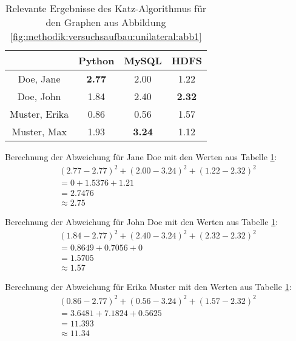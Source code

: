 \begin{table}[h]
	\centering
	\begin{tabular}{c|c|c|c}
		& Python & MySQL & HDFS\\ 
		\hline
		Doe, Jane     & \cellcolor{usercolor}\textbf{2.77} & \cellcolor{itemcolor}2.00 & \cellcolor{exxetagray}1.22\\
		Doe, John     & \cellcolor{exxetagray}1.84 & \cellcolor{itemcolor}2.40 & \cellcolor{itemcolor}\textbf{2.32}\\
		Muster, Erika & \cellcolor{exxetagray}0.86 & \cellcolor{exxetagray}0.56 & \cellcolor{usercolor}1.57\\
		Muster, Max   & \cellcolor{itemcolor}1.93 & \cellcolor{itemcolor}\textbf{3.24} & \cellcolor{exxetagray}1.12
	\end{tabular}
	\caption{Relevante Ergebnisse des Katz-Algorithmus für den Graphen aus Abbildung \ref{fig:methodik:versuchsaufbau:unilateral:abb1}}
	\label{tbl:nebenrechnungen:bilateral:tbl2}
\end{table}

Berechnung der Abweichung für Jane Doe mit den Werten aus Tabelle \ref{tbl:nebenrechnungen:bilateral:tbl2}:
\begin{gather}
	\nonumber (2.77-2.77)^2 + (2.00-3.24)^2 + (1.22-2.32)^2\\
	\nonumber = 0 + 1.5376 + 1.21\\
	\nonumber = 2.7476\\
	\approx 2.75
	\label{frml:nebenrechnungen:bilateral:jane}
\end{gather}

Berechnung der Abweichung für John Doe mit den Werten aus Tabelle \ref{tbl:nebenrechnungen:bilateral:tbl2}:
\begin{gather}
	\nonumber (1.84-2.77)^2 + (2.40-3.24)^2 + (2.32-2.32)^2\\
	\nonumber = 0.8649 + 0.7056 + 0\\
	\nonumber = 1.5705\\
	\approx 1.57
	\label{frml:nebenrechnungen:bilateral:john}
\end{gather}

Berechnung der Abweichung für Erika Muster mit den Werten aus Tabelle \ref{tbl:nebenrechnungen:bilateral:tbl2}:
\begin{gather}
	\nonumber (0.86-2.77)^2 + (0.56-3.24)^2 + (1.57-2.32)^2\\
	\nonumber = 3.6481 + 7.1824 + 0.5625\\
	\nonumber = 11.393\\
	\approx 11.34
	\label{frml:nebenrechnungen:bilateral:erika}
\end{gather}

